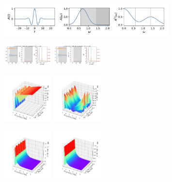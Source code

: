 \documentclass[a4paper]{article}
\begin{document}
\begin{figure}[H]
  \centering
  \includegraphics[width=0.8\textwidth]{A0.pdf}
\end{figure}
\begin{figure}[H]
  \centering
  \includegraphics[width=0.23\textwidth]{HL-A0-v0-imp3.pdf}
  \includegraphics[width=0.23\textwidth]{HL-A0-v0-imp4.pdf}
\end{figure}
\begin{figure}[H]
  \centering
  \includegraphics[width=0.23\textwidth]{cond3d_real-A0-v0-imp3.pdf}
  \includegraphics[width=0.23\textwidth]{cond3d_real-A0-v0-imp4.pdf}
\end{figure}
\begin{figure}[H]
  \centering
  \includegraphics[width=0.23\textwidth]{cond3d_imag-A0-v0-imp3.pdf}
  \includegraphics[width=0.23\textwidth]{cond3d_imag-A0-v0-imp4.pdf}
\end{figure}
\end{document}
